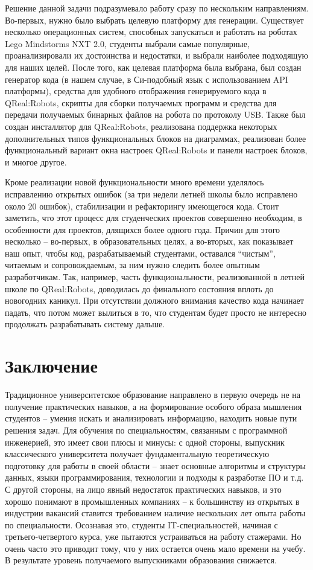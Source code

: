 \documentclass[a4paper]{article}
\begin{document}
Решение данной задачи подразумевало работу сразу по нескольким направлениям. Во-первых, нужно было выбрать целевую платформу для генерации. Существует несколько операционных систем, способных запускаться и работать на роботах Lego Mindstorms NXT 2.0, студенты выбрали самые популярные, проанализировали их достоинства и недостатки, и выбрали наиболее подходящую для наших целей. После того, как целевая платформа была выбрана, был создан генератор кода (в нашем случае, в Си-подобный язык с использованием API платформы), средства для удобного отображения генерируемого кода в QReal:Robots, скрипты для сборки получаемых программ и средства для передачи получаемых бинарных файлов на робота по протоколу USB. Также был создан инсталлятор для QReal:Robots, реализована поддержка некоторых дополнительных типов функциональных блоков на диаграммах, реализован более функциональный вариант окна настроек QReal:Robots и панели настроек блоков,  и многое другое.

Кроме реализации новой функциональности много времени уделялось исправлению открытых ошибок (за три недели летней школы было исправлено около 20 ошибок), стабилизации и рефакторингу имеющегося кода. Стоит заметить, что этот процесс для студенческих проектов совершенно необходим, в особенности для проектов, длящихся более одного года. Причин для этого несколько -- во-первых, в образовательных целях, а во-вторых, как показывает наш опыт, чтобы код, разрабатываемый студентами, оставался ``чистым'', читаемым и сопровождаемым, за ним нужно следить более опытным разработчикам. Так, например, часть функциональности, реализованной в летней школе по QReal:Robots, доводилась до финального состояния вплоть до новогодних каникул. При отсутствии должного внимания качество кода начинает падать, что потом может вылиться в то, что студентам будет просто не интересно продолжать разрабатывать систему дальше. 

\section{Заключение} 

Традиционное университетское образование направлено в первую очередь не на получение практических навыков, а на формирование особого образа мышления студентов -- умения искать и анализировать информацию, находить новые пути решения задач. Для обучения по специальностям, связанным с программной инженерией, это имеет свои плюсы и минусы: с одной стороны, выпускник классического университета получает фундаментальную теоретическую подготовку для работы в своей области -- знает основные алгоритмы и структуры данных, языки программирования, технологии и подходы к разработке ПО и т.д. С другой стороны, на лицо явный недостаток практических навыков, и это хорошо понимают в промышленных компаниях -- к большинству из открытых в индустрии вакансий ставится требованием наличие нескольких лет опыта работы по специальности. Осознавая это, студенты IT-специальностей, начиная с третьего-четвертого курса, уже пытаются устраиваться на работу стажерами. Но очень часто это приводит тому, что у них остается очень мало времени на учебу. В результате уровень получаемого выпускниками образования снижается.
\end{document}
